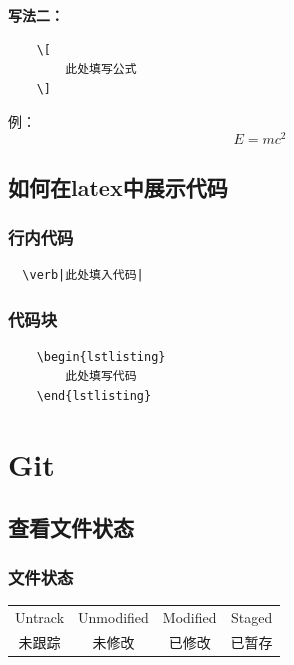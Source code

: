 \documentclass[UTF8,a4paper]{ctexart}
\begin{document}
\textbf{写法二：}
\begin{lstlisting}
    \[
        此处填写公式
    \]
\end{lstlisting}
\qquad 例：
\[
    E=mc^2
\]

\subsection{如何在latex中展示代码} 
\subsubsection{行内代码} 
\begin{lstlisting}
  \verb|此处填入代码|
\end{lstlisting}

\subsubsection{代码块} 
\begin{Verbatim}
    \begin{lstlisting}
        此处填写代码
    \end{lstlisting}
\end{Verbatim}


\newpage
\section{Git}
\subsection{查看文件状态}
\subsubsection{文件状态}
\begin{table}[H]
    \centering
    \begin{tabular}{|c|c|c|c|}
        \hline
        Untrack & Unmodified & Modified & Staged\\
        未跟踪 & 未修改 & 已修改 & 已暂存\\
        \hline
    \end{tabular}
\end{table}
\end{document}
